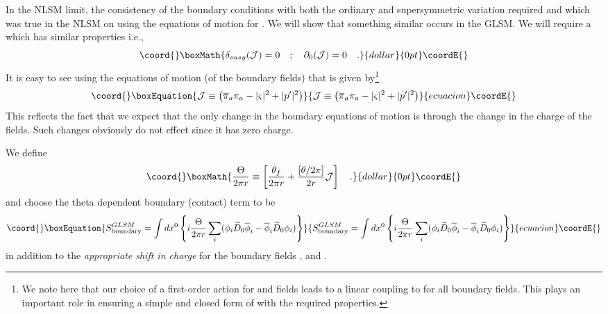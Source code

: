 \documentclass[a4paper,12pt]{article}
\begin{document}
In the NLSM limit, the consistency of the boundary conditions with both
the ordinary and supersymmetric variation required
\coordHE{} and
\coordHE{} which was true in the NLSM on using
the equations of motion for \myHighlight{$\pi$}\coordHE{}. We
will show that something similar occurs in the GLSM. We will
require a \coordHE{} which has similar properties i.e.,
$$\coord{}\boxMath{
\delta_{susy}({\cal J})=0\quad;\quad \partial_0 ({\cal J})=0
\label{curlyJ} \quad.
}{dollar}{0pt}\coordE{}$$
It is easy to see using the equations of motion (of the boundary fields)
that \coordHE{} is  given by\footnote{We note here that our 
choice of a first-order action for \myHighlight{$\varsigma$}\coordHE{} and \coordHE{} fields leads to 
a linear coupling to \coordHE{} for all boundary fields. This plays
an important role in ensuring a simple and closed form of \coordHE{} with
the required properties.}
\begin{equation}\coord{}\boxEquation{
{\cal J} \equiv \left (\overline{\pi}_a \pi_a - |\varsigma|^2 + |p'|^2
\right)
}{
{\cal J} \equiv \left (\overline{\pi}_a \pi_a - |\varsigma|^2 + |p'|^2
\right)
}{ecuacion}\coordE{}\end{equation}
This reflects the fact that we expect that the only change in
the boundary equations  of motion is through the change in the 
charge of the fields. Such changes obviously do not effect \coordHE{} since it has zero charge.

We define 
$$\coord{}\boxMath{
{\Theta\over{2\pi r}}\equiv \left[{{\theta_f}\over{2\pi r}} 
+{{[\theta/2\pi]}\over{2 r}} {\cal J}\right]\quad.
}{dollar}{0pt}\coordE{}$$
and choose the theta dependent boundary (contact) term to be
\begin{equation}\coord{}\boxEquation{
S^{GLSM}_{\rm boundary}= \int dx^0\left\{  i{\Theta\over{2\pi r}}
\sum_i (\phi_i \widetilde{D}_0\overline{\phi}_i - \overline{\phi}_i
\widetilde{D}_0 \phi_i)
\right\}
}{
S^{GLSM}_{\rm boundary}= \int dx^0\left\{  i{\Theta\over{2\pi r}}
\sum_i (\phi_i \widetilde{D}_0\overline{\phi}_i - \overline{\phi}_i
\widetilde{D}_0 \phi_i)
\right\}
}{ecuacion}\coordE{}\end{equation}
in addition to the {\em appropriate shift in charge} for the boundary fields
\myHighlight{$\pi$}\coordHE{}, \coordHE{} and \myHighlight{$\varsigma$}\coordHE{}.
\end{document}
